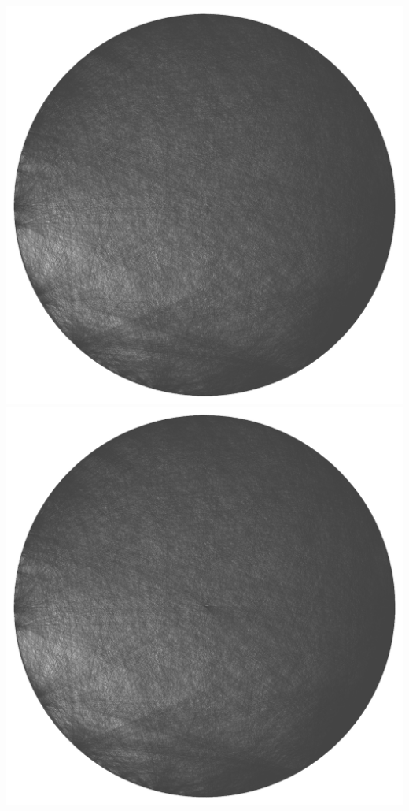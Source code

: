 \documentclass[12pt, a4paper]{article}
\begin{document}
\begin{multicols}{2}
{\centering
\includegraphics[width=\columnwidth]{src/youtube/hdg/comp/1_plot_crc}\\
\label{fig:hdg_c1}}
{\centering
\includegraphics[width=\columnwidth]{src/youtube/hdg/comp/2_plot_str}\\
\label{fig:hdg_c2}}
\end{multicols}
\end{document}
